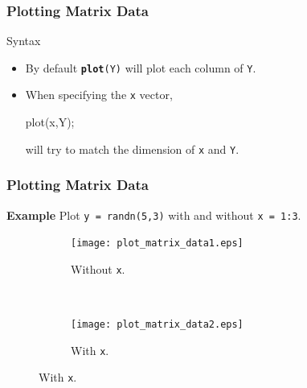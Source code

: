 \documentclass[compress]{beamer}  %
\newcommand{\tttbf}[1]{\texttt{\textbf{#1}}} %
\begin{document}
\begin{frame}[fragile]
\frametitle{Plotting Matrix Data}

\begin{block}{Syntax}
\begin{itemize}[<+->]
    \item By default \tttbf{plot}\texttt{(Y)} will plot each column of \texttt{Y}.
    \item When specifying the \texttt{x} vector,
          \begin{matlabcodebeamer}[frame=none]
          plot(x,Y);
          \end{matlabcodebeamer}
          will try to match the dimension of \texttt{x} and \texttt{Y}.
\end{itemize}
\end{block}

\end{frame}
\begin{frame}[fragile]
\frametitle{Plotting Matrix Data}
\textbf{Example} 
Plot \texttt{y = randn(5,3)} with and without \texttt{x = 1:3}.\pause
\setcounter{subfigure}{0}
\begin{figure}
        \begin{subfigure}[b]{0.3\textwidth}
                \centering
                \texttt{[image: plot\_matrix\_data1.eps]}
                \caption{Without \texttt{x}.}
        \end{subfigure}%
        ~\pause
        \begin{subfigure}[b]{0.3\textwidth}
                \centering
                \texttt{[image: plot\_matrix\_data2.eps]}
                \caption{With \texttt{x}.}
        \end{subfigure}
\end{figure}

\end{frame}
\end{document}
